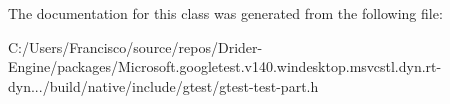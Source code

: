 The documentation for this class was generated from the following file\+:\begin{DoxyCompactItemize}
\item 
C\+:/\+Users/\+Francisco/source/repos/\+Drider-\/\+Engine/packages/\+Microsoft.\+googletest.\+v140.\+windesktop.\+msvcstl.\+dyn.\+rt-\/dyn.../build/native/include/gtest/gtest-\/test-\/part.\+h\end{DoxyCompactItemize}

